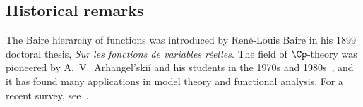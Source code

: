 \subsection*{Historical remarks}
The Baire hierarchy of functions was introduced by René-Louis Baire in his 1899 doctoral thesis, \emph{Sur les fonctions de variables réelles}.
The field of $\Cp$-theory was pioneered by A.~V.~Arhangel'skiĭ and his students in the 1970s and 1980s~\cite{Arkhangelskii:1992}, and
it has found many applications in model theory and functional analysis.
For a recent survey, see~\cite{tkachuk2011cp}.